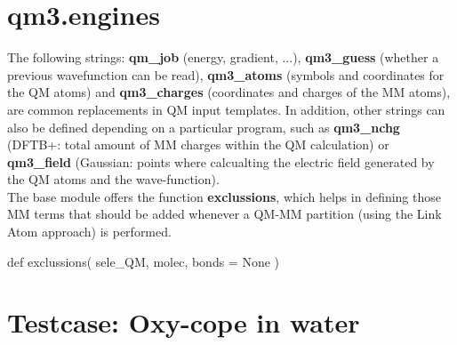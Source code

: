 \documentclass[10pt]{article}
\newcommand{\func}[1]{\textcolor{fcol}{\textbf{\fontspec{Anonymous Pro}#1}}}
\begin{document}
\section{qm3.engines}
The following strings: \textbf{qm\_job} (energy, gradient, ...), \textbf{qm3\_guess} (whether
a previous wavefunction can be read), \textbf{qm3\_atoms} (symbols and coordinates for the QM atoms) and
\textbf{qm3\_charges} (coordinates and charges of the MM atoms), are common replacements
in QM input templates. In addition, other strings can also be defined depending on a particular program,
such as \textbf{qm3\_nchg} (DFTB+: total amount of MM charges within the QM calculation)
or \textbf{qm3\_field} (Gaussian: points where calcualting the electric field generated by
the QM atoms and the wave-function).\\
The base module offers the function \func{exclussions}, which helps in defining those 
MM terms that should be added whenever a QM-MM partition (using the Link Atom approach) is performed.
\begin{pyglist}[language=python,fvset={frame=single}]
def exclussions( sele_QM, molec, bonds = None )
\end{pyglist}




























\section{Testcase: Oxy-cope in water}



\end{document}
